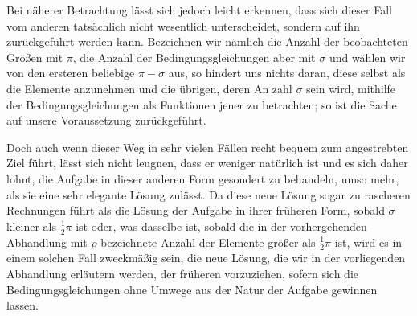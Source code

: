 Bei näherer Betrachtung lässt sich jedoch leicht erkennen, dass sich dieser Fall vom anderen tatsächlich nicht wesentlich unterscheidet, sondern auf ihn zurückgeführt werden kann. Bezeichnen wir nämlich die Anzahl der beobachteten Größen mit \(\pi\), die Anzahl der Bedingungsgleichungen aber mit \(\sigma\) und wählen wir von den ersteren beliebige \(\pi-\sigma\) aus, so hindert uns nichts daran, diese selbst als die Elemente anzunehmen und die übrigen, deren An%
zahl \(\sigma\) sein wird, mithilfe der Bedingungsgleichungen als Funktionen jener zu betrachten; so ist die Sache auf unsere Voraussetzung zurückgeführt.

Doch auch wenn dieser Weg in sehr vielen Fällen recht bequem zum angestrebten Ziel führt, lässt sich nicht leugnen, dass er weniger natürlich ist und es sich daher lohnt, die Aufgabe in dieser anderen Form gesondert zu behandeln, umso mehr, als sie eine sehr elegante Lösung zulässt. Da diese neue Lösung sogar zu rascheren Rechnungen führt als die Lösung der Aufgabe in ihrer früheren Form, sobald \(\sigma\) kleiner als \(\frac12\pi\) ist oder, was dasselbe ist, sobald die in der vorhergehenden Abhandlung mit \(\rho\) bezeichnete Anzahl der Elemente größer als \(\frac12\pi\) ist, wird es in einem solchen Fall zweckmäßig sein, die neue Lösung, die wir in der vorliegenden Abhandlung erläutern werden, der früheren vorzuziehen, sofern sich die Bedingungsgleichungen ohne Umwege aus der Natur der Aufgabe gewinnen lassen.

